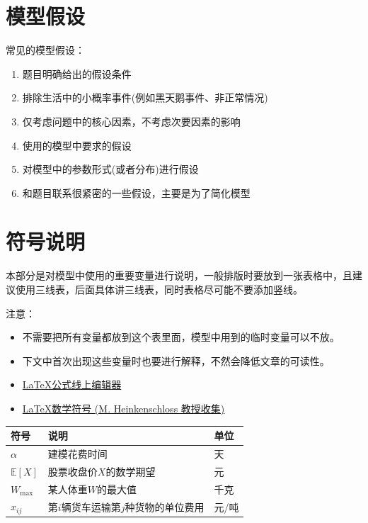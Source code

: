 \documentclass[12pt,utf8]{article}
\begin{document}
\section{模型假设}

常见的模型假设：
\begin{enumerate}
\item 题目明确给出的假设条件
\item 排除生活中的小概率事件(例如黑天鹅事件、非正常情况)
\item 仅考虑问题中的核心因素，不考虑次要因素的影响
\item 使用的模型中要求的假设
\item 对模型中的参数形式(或者分布)进行假设
\item 和题目联系很紧密的一些假设，主要是为了简化模型
\end{enumerate}

\section{符号说明}

本部分是对模型中使用的重要变量进行说明，一般排版时要放到一张表格中，且建议使用三线表，后面具体讲三线表，同时表格尽可能不要添加竖线。

注意：
\begin{itemize}
\item 不需要把所有变量都放到这个表里面，模型中用到的临时变量可以不放。
\item 下文中首次出现这些变量时也要进行解释，不然会降低文章的可读性。
\item \href{https://www.latexlive.com/}{\LaTeX 公式线上编辑器}
\item \href{https://www.caam.rice.edu/~heinken/latex/symbols.pdf}{\LaTeX 数学符号 (M. Heinkenschloss 教授收集) }
\end{itemize}

\begin{table}[h]
\centering
\begin{tabular}{p{2cm}<{\centering}p{9cm}<{\centering}p{2cm}<{\centering}}
   \toprule
   符号 & 说明 & 单位 \\
   \midrule
   $\alpha$ & 建模花费时间  & 天   \\
   $\mathbb{E}[X]$ & 股票收盘价$X$的数学期望 & 元 \\
   $W_{\text{max}}$ & 某人体重$W$的最大值 & 千克  \\
   $x_{ij}$ & 第$i$辆货车运输第$j$种货物的单位费用&  元/吨 \\
   \bottomrule
\end{tabular}
\end{table}
\end{document}

